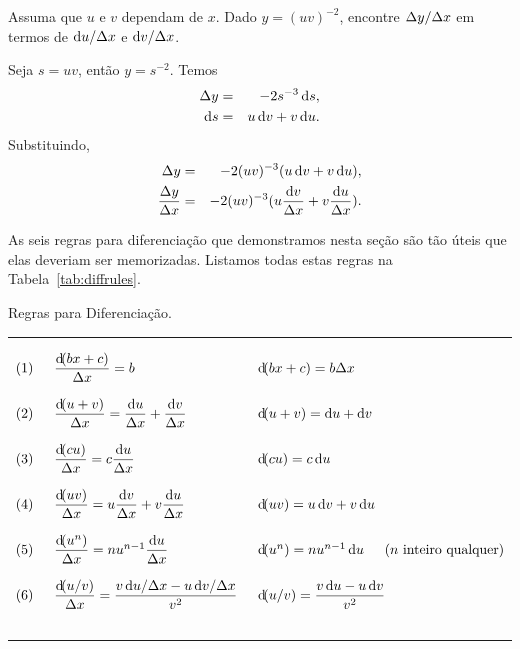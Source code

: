 \begin{example}
Assuma que $u$ e $v$ dependam de $x$. Dado $y = (uv)^{-2}$, encontre
$\Delta{y}/\Delta{x}$ em termos de $\du/\dx$ e $\dv/\dx$.

Seja $s = uv$, então $y = s^{-2}$. Temos
\begin{eqnarray*}
  \dy & = & -2s^{-3} \dif s, \\
  \dif s & = & u \dv + v \du.
\end{eqnarray*}
Substituindo,
\begin{eqnarray*}
  \dy & = & -2(uv)^{-3} (u \dv + v \du), \\
  \frac{\dy}{\dx} & = & -2(uv)^{-3} (u \frac{\dv}{\dx} + v \frac{\du}{\dx}).
\end{eqnarray*}
\end{example}

As seis regras para diferenciação que demonstramos nesta seção são tão
úteis que elas deveriam ser memorizadas. Listamos todas estas regras
na Tabela~\ref{tab:diffrules}.

\begin{table}
\caption{Regras para Diferenciação.}
\label{tab:diffrules}

\hrule
\vspace{1.5em}

$$
\begin{array}{c@{\hspace{1.5em}}l@{\hspace{1.5em}}l}
  (1) & \dfrac{\dif(bx+c)}{\dx} = b &
        \dif(bx+c) = b \dx \\[1.5em]
  (2) & \dfrac{\dif(u+v)}{\dx} = \dfrac{\du}{\dx} + \dfrac{\dv}{\dx} &
        \dif(u+v) = \du + \dv \\[1.5em]
  (3) & \dfrac{\dif(cu)}{\dx} = c \dfrac{\du}{\dx} &
        \dif(cu) = c \du \\[1.5em]
  (4) & \dfrac{\dif(u v)}{\dx} = u \dfrac{\dv}{\dx} + v \dfrac{\du}{\dx} &
        \dif(uv) = u \dv + v \du \\[1.5em]
  (5) & \dfrac{\dif(u^n)}{\dx} = n u^{n-1} \dfrac{\du}{\dx} &
        \dif(u^n) = n u^{n-1} \du \hspace{1.5em} \text{($n$ inteiro qualquer)} \\[1.5em]
  (6) & \dfrac{\dif(u/v)}{\dx} = \dfrac{v \du/\dx - u \dv/\dx}{v^2} &
        \dif(u/v) = \dfrac{v \du - u \dv}{v^2} \\[1.5em]
\end{array}
$$
\hrule
\end{table}

